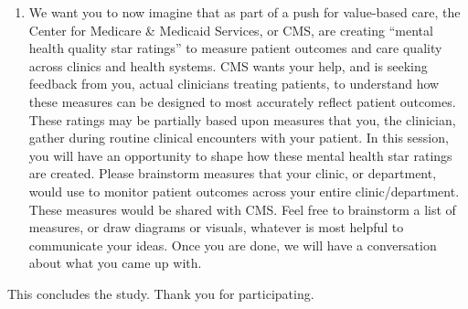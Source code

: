 \begin{enumerate}
    \item We want you to now imagine that as part of a push for value-based care, the Center for Medicare \& Medicaid Services, or CMS, are creating “mental health quality star ratings” to measure patient outcomes and care quality across clinics and health systems. 
    CMS wants your help, and is seeking feedback from you, actual clinicians treating patients, to understand how these measures can be designed to most accurately reflect patient outcomes. 
    These ratings may be partially based upon measures that you, the clinician, gather during routine clinical encounters with your patient. 
    In this session, you will have an opportunity to shape how these mental health star ratings are created.
    Please brainstorm measures that your clinic, or department, would use to monitor patient outcomes across your entire clinic/department. 
    These measures would be shared with CMS. 
    Feel free to brainstorm a list of measures, or draw diagrams or visuals, whatever is most helpful to communicate your ideas. Once you are done, we will have a conversation about what you came up with.
\end{enumerate}

This concludes the study. Thank you for participating.